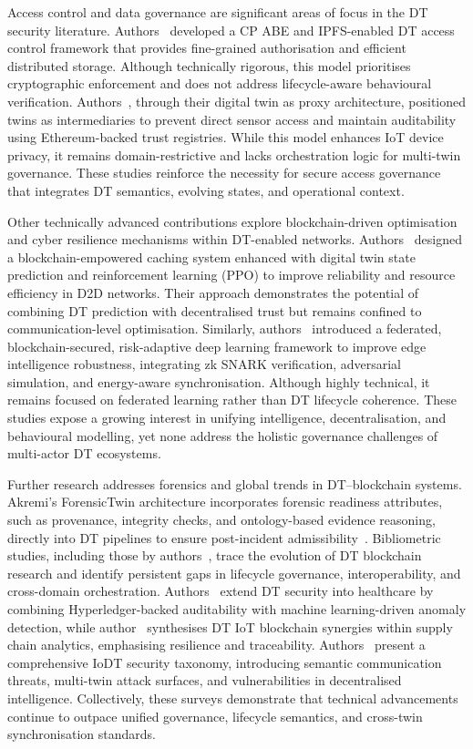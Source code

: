 \documentclass[final,5p,times,twocolumn]{elsarticle}
\begin{document}
Access control and data governance are significant areas of focus in the DT security literature. Authors~\cite{dai2024blockchain} developed a CP ABE  and IPFS-enabled DT access control framework that provides fine-grained authorisation and efficient distributed storage. Although technically rigorous, this model prioritises cryptographic enforcement and does not address lifecycle-aware behavioural verification. Authors~\cite{samaniego2023digital}, through their digital twin as proxy architecture, positioned twins as intermediaries to prevent direct sensor access and maintain auditability using Ethereum-backed trust registries. While this model enhances IoT device privacy, it remains domain-restrictive and lacks orchestration logic for multi-twin governance. These studies reinforce the necessity for secure access governance that integrates DT semantics, evolving states, and operational context.

Other technically advanced contributions explore blockchain-driven optimisation and cyber resilience mechanisms within DT-enabled networks. Authors~\cite{du2025blockchain} designed a blockchain-empowered caching system enhanced with digital twin state prediction and reinforcement learning (PPO) to improve reliability and resource efficiency in D2D networks. Their approach demonstrates the potential of combining DT prediction with decentralised trust but remains confined to communication-level optimisation. Similarly, authors~\cite{swathi2025secure} introduced a federated, blockchain-secured, risk-adaptive deep learning framework to improve edge intelligence robustness, integrating zk SNARK verification, adversarial simulation, and energy-aware synchronisation. Although highly technical, it remains focused on federated learning rather than DT lifecycle coherence. These studies expose a growing interest in unifying intelligence, decentralisation, and behavioural modelling, yet none address the holistic governance challenges of multi-actor DT ecosystems.

Further research addresses forensics and global trends in DT–blockchain systems. Akremi’s ForensicTwin architecture incorporates forensic readiness attributes, such as provenance, integrity checks, and ontology-based evidence reasoning, directly into DT pipelines to ensure post-incident admissibility~\cite{akremi2025forensictwin}. Bibliometric studies, including those by authors~\cite{ma2024examining}, trace the evolution of DT blockchain research and identify persistent gaps in lifecycle governance, interoperability, and cross-domain orchestration. Authors~\cite{wakili2025digital} extend DT security into healthcare by combining Hyperledger-backed auditability with machine learning-driven anomaly detection, while author~\cite{louis2025advanced} synthesises DT IoT blockchain synergies within supply chain analytics, emphasising resilience and traceability. Authors~\cite{wang2023survey} present a comprehensive IoDT security taxonomy, introducing semantic communication threats, multi-twin attack surfaces, and vulnerabilities in decentralised intelligence. Collectively, these surveys demonstrate that technical advancements continue to outpace unified governance, lifecycle semantics, and cross-twin synchronisation standards.
\end{document}
